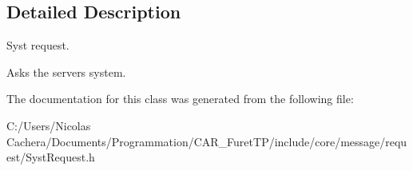 \subsection{Detailed Description}
Syst request. 

Asks the server\textquotesingle{}s system. 

The documentation for this class was generated from the following file\+:\begin{DoxyCompactItemize}
\item 
C\+:/\+Users/\+Nicolas Cachera/\+Documents/\+Programmation/\+C\+A\+R\+\_\+\+Furet\+T\+P/include/core/message/request/Syst\+Request.\+h\end{DoxyCompactItemize}
